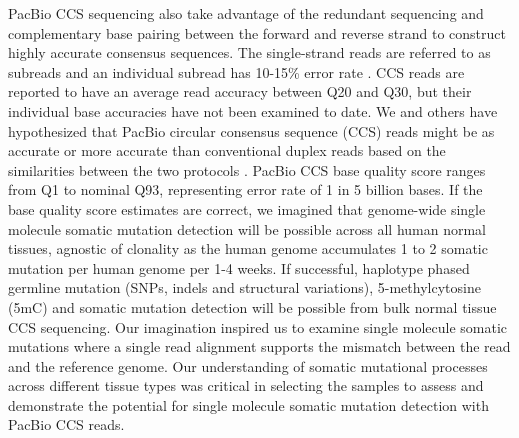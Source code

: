 PacBio CCS sequencing also take advantage of the redundant sequencing and complementary base pairing between the forward and reverse strand to construct highly accurate consensus sequences. The single-strand reads are referred to as subreads and an individual subread has 10-15\% error rate \cite{Chaisson2012-vr}. CCS reads are reported to have an average read accuracy between Q20 and Q30, but their individual base accuracies have not been examined to date. We and others have hypothesized that PacBio circular consensus sequence (CCS) reads might be as accurate or more accurate than conventional duplex reads based on the similarities between the two protocols \cite{Wenger2019-pw}. PacBio CCS base quality score ranges from Q1 to nominal Q93, representing error rate of 1 in 5 billion bases. If the base quality score estimates are correct, we imagined that genome-wide single molecule somatic mutation detection will be possible across all human normal tissues, agnostic of clonality as the human genome accumulates 1 to 2 somatic mutation per human genome per 1-4 weeks. If successful, haplotype phased germline mutation (SNPs, indels and structural variations), 5-methylcytosine (5mC) and somatic mutation detection will be possible from bulk normal tissue CCS sequencing. Our imagination inspired us to examine single molecule somatic mutations where a single read alignment supports the mismatch between the read and the reference genome. Our understanding of somatic mutational processes across different tissue types was critical in selecting the samples to assess and demonstrate the potential for single molecule somatic mutation detection with PacBio CCS reads. 

